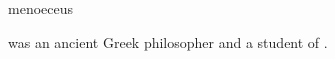 \documentclass{stex}
\begin{document}
\begin{smodule}{menoeceus}
\begin{sparagraph}[style=symdoc]
 was an ancient Greek philosopher and a student of
.
\end{sparagraph}
\end{smodule}
\end{document}
